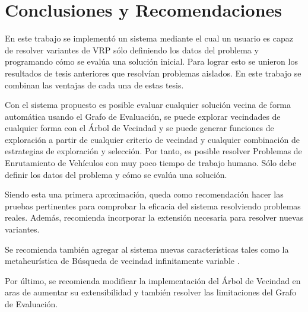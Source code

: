 \chapter*{Conclusiones y Recomendaciones}\label{chapter:conclusions}
En este trabajo se implementó un sistema mediante el cual un usuario es capaz de resolver variantes de VRP sólo definiendo los datos del problema y programando cómo se evalúa una solución inicial. Para lograr esto se unieron los resultados de tesis anteriores \cite{Hector}\cite{JJ}\cite{Heidy} que resolvían problemas aislados. En este trabajo se combinan las ventajas de cada una de estas tesis.

Con el sistema propuesto es posible evaluar cualquier solución vecina de forma automática usando el Grafo de Evaluación, se puede explorar vecindades de cualquier forma con el Árbol de Vecindad y se puede generar funciones de exploración a partir de cualquier criterio de vecindad y cualquier combinación de estrategias de exploración y selección. Por tanto, es posible resolver Problemas de Enrutamiento de Vehículos con muy poco tiempo de trabajo humano. Sólo debe definir los datos del problema y cómo se evalúa una solución.

Siendo esta una primera aproximación, queda como recomendación hacer las pruebas pertinentes para comprobar la eficacia del sistema resolviendo problemas reales. Además, recomienda incorporar la extensión necesaria para resolver nuevas variantes.

Se recomienda también agregar al sistema nuevas características tales como la metaheurística de Búsqueda de vecindad infinitamente variable \cite{Heidy}.

Por último, se recomienda modificar la implementación del Árbol de Vecindad en aras de aumentar su extensibilidad y también resolver las limitaciones del Grafo de Evaluación.


